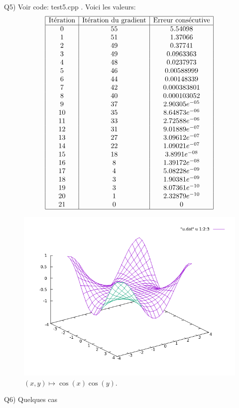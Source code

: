 \documentclass[a4paper, 11pt]{article}
\begin{document}
\newpage

Q5) Voir code: test5.cpp . Voici les valeurs: \\
$$
\begin{array}{|c|c|c|}
\hline
\text{It\'eration} & \text{It\'eration du gradient} & \text{Erreur cons\'ecutive}
 \\
\hline
0 & 55 & 5.54098 \\
1 & 51 & 1.37066 \\
2 & 49 & 0.37741 \\
3 & 49 & 0.0963363 \\
4 & 48 & 0.0237973 \\
5 & 46 & 0.00588999 \\
6 & 44 & 0.00148339 \\
7 & 42 & 0.000383801 \\
8 & 40 & 0.000103052 \\
9 & 37 & 2.90305e^{-05} \\
10 & 35 & 8.64873e^{-06} \\
11 & 33 & 2.72588e^{-06} \\
12 & 31 & 9.01889e^{-07} \\
13 & 27 & 3.09612e^{-07} \\
14 & 22 & 1.09021e^{-07} \\
15 & 18 & 3.8991e^{-08} \\
16 & 8 & 1.39172e^{-08} \\
17 & 4 & 5.08228e^{-09} \\
18 & 3 & 1.90381e^{-09} \\
19 & 3 & 8.07361e^{-10} \\
20 & 1 & 2.32879e^{-10} \\
21 & 0 & 0 \\
\hline
\end{array}
$$

\begin{figure}[h!]
  \centering
  \includegraphics[width=\linewidth]{cos_cos.png}
  \caption{$(x, y)\mapsto\cos(x)\cos(y)$.}
  \label{fig:cos_cos}
\end{figure}

\newpage

Q6) Quelques cas
\end{document}
